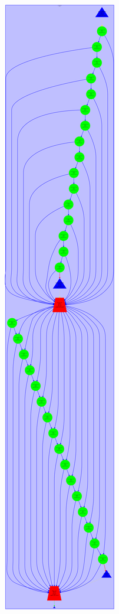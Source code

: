 \documentclass[12pt, a4paper]{article}
\begin{document}
\begin{figure}[H]
\centering
\begin{subfigure}{0.45\textwidth}
\centering
\includegraphics[scale=0.15]{./images/tareador-jacobi-2a}
\caption{\label{fig:TDGJacobi}}

\end{subfigure}
\end{figure}
\end{document}
